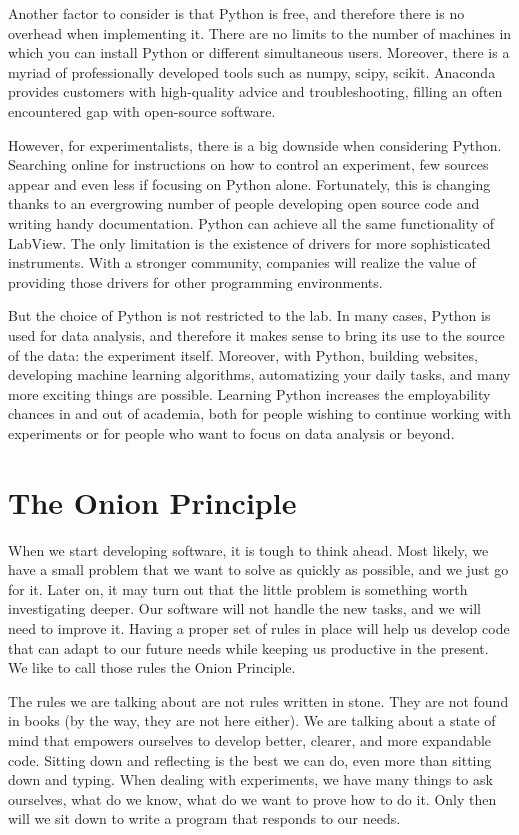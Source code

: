 Another factor to consider is that Python is free, and therefore there is no overhead when implementing it. There are no limits to the number of machines in which you can install Python or different simultaneous users. Moreover, there is a myriad of professionally developed tools such as numpy, scipy, scikit. Anaconda provides customers with high-quality advice and troubleshooting, filling an often encountered gap with open-source software.

However, for experimentalists, there is a big downside when considering Python. Searching online for instructions on how to control an experiment, few sources appear and even less if focusing on Python alone. Fortunately, this is changing thanks to an evergrowing number of people developing open source code and writing handy documentation. Python can achieve all the same functionality of LabView. The only limitation is the existence of drivers for more sophisticated instruments. With a stronger community, companies will realize the value of providing those drivers for other programming environments.

But the choice of Python is not restricted to the lab. In many cases, Python is used for data analysis, and therefore it makes sense to bring its use to the source of the data: the experiment itself. Moreover, with Python, building websites, developing machine learning algorithms, automatizing your daily tasks, and many more exciting things are possible. Learning Python increases the employability chances in and out of academia, both for people wishing to continue working with experiments or for people who want to focus on data analysis or beyond.

\section{The Onion Principle}\label{sec:onion-principle}
When we start developing software, it is tough to think ahead. Most likely, we have a small problem that we want to solve as quickly as possible, and we just go for it. Later on, it may turn out that the little problem is something worth investigating deeper. Our software will not handle the new tasks, and we will need to improve it. Having a proper set of rules in place will help us develop code that can adapt to our future needs while keeping us productive in the present. We like to call those rules the Onion Principle.

The rules we are talking about are not rules written in stone. They are not found in books (by the way, they are not here either). We are talking about a state of mind that empowers ourselves to develop better, clearer, and more expandable code. Sitting down and reflecting is the best we can do, even more than sitting down and typing. When dealing with experiments, we have many things to ask ourselves, what do we know, what do we want to prove how to do it. Only then will we sit down to write a program that responds to our needs.

